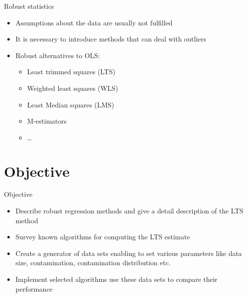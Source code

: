 \documentclass{beamer}
\begin{document}
\begin{frame}{Robust statistics}
  \begin{itemize}
    \item Assumptions about the data are usually not fulfilled
    \item It is necessary to introduce methods that can deal with outliers
    \item Robust alternatives to OLS:
    \begin{itemize}
      \item Least trimmed squares (LTS)
      \item Weighted least squares (WLS)
      \item Least Median squares (LMS)
      \item M-estimators
      \item \dots
     \end{itemize}
   \end{itemize}
\end{frame}

\section{Objective}
\setcounter{subsection}{1}

\begin{frame}{Objective}
\begin{itemize}
\item  Describe robust regression methods and give a detail description of the LTS method
\item Survey known algorithms for computing the LTS estimate
\item Create a generator of data sets enabling to set various parameters like data size, contamination, contamination distribution etc.
\item Implement selected algorithms use these data sets to compare their performance
\end{itemize}
\end{frame}




\end{document}

